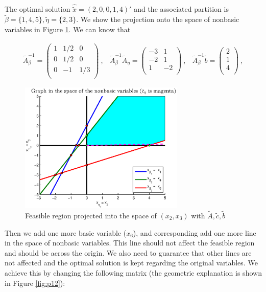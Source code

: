 The optimal solution $\hat{\tilde{x}} = (2,0,0,1,4)'$ and the associated partition is $\tilde{\beta} = \{1,4,5\}, \tilde{\eta}= \{2,3\}$. We show the projection onto the space of nonbasic variables in Figure \ref{fig:p11}. We can know that 

\[
\begin{array}{ccc}
\tilde{A}_\beta^{-1}  =  \left(
  \begin{array}{ccc}
    1 & 1/2 & 0   \\
    0 & 1/2 & 0 \\
    0 & -1 & 1/3\\
  \end{array}
\right)~, &

\tilde{A}_\beta^{-1}\tilde{A}_\eta  =  \left(
  \begin{array}{cc}
    -3 & 1   \\
    -2 & 1 \\
    1 & -2\\
  \end{array}
\right)~,&

\tilde{A}_\beta^{-1}\tilde{b}  =  \left(
  \begin{array}{c}
    2   \\
    1 \\
    4\\
  \end{array}
\right)~,

\end{array}
\]

\begin{figure}[h!!]
\includegraphics[width=0.7\textwidth]{p2/initial.eps}
\caption{Feasible region projected into the space of $(x_2,x_3)$ with $\tilde{A},\tilde{c},\tilde{b}$}\label{fig:p11}
\end{figure}

Then we add one more basic variable ($x_6$), and corresponding add one more line in the space of nonbasic variables. This line should not affect the feasible region and should be across the origin. We also need to guarantee that other lines are not affected and the optimal solution is kept regarding the original variables. We achieve this by changing the following matrix (the geometric explanation is shown in Figure \ref{fig:p12}):

